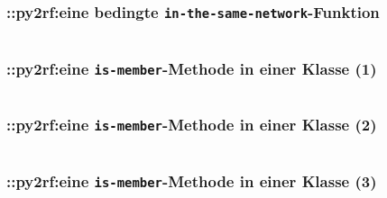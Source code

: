 \begin{frame}[fragile]  
  \frametitle{::py2rf:eine bedingte \texttt{in-the-same-network}-Funktion}

  \begin{center}
  \begin{minipage}{0.9\textwidth}
    \inputminted[fontsize=\footnotesize,linenos]{python}{\snpLf/ex-py2fr-d-in-same-nw-cond.py}
  \end{minipage}
  \end{center}
\end{frame}

\begin{frame}[fragile]  
  \frametitle{::py2rf:eine \texttt{is-member}-Methode in einer Klasse (1)}

  \begin{center}
  \begin{minipage}{0.9\textwidth}
    \inputminted[fontsize=\footnotesize,linenos]{python}{\snpLf/mod_py2fr_nwcore.py}
  \end{minipage}
  \end{center}
\end{frame}

\begin{frame}[fragile]  
  \frametitle{::py2rf:eine \texttt{is-member}-Methode in einer Klasse (2)}

  \begin{center}
  \begin{minipage}{0.9\textwidth}
    \inputminted[fontsize=\tiny,linenos]{python}{\snpLf/mod_py2fr_nw.py}
  \end{minipage}
  \end{center}
\end{frame}

\begin{frame}[fragile]  
  \frametitle{::py2rf:eine \texttt{is-member}-Methode in einer Klasse (3)}

  \begin{center}
  \begin{minipage}{0.9\textwidth}
    \inputminted[fontsize=\footnotesize,linenos]{python}{\snpLf/ex-py2fr-e-nw-class.py}
  \end{minipage}
  \end{center}
\end{frame}
